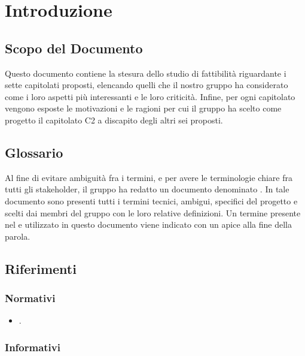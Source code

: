 \section{Introduzione}
\subsection{Scopo del Documento}
Questo documento contiene la stesura dello studio di fattibilità riguardante i sette capitolati proposti, elencando quelli che il nostro gruppo ha considerato come i loro aspetti più interessanti e le loro criticità. Infine, per ogni capitolato vengono esposte le motivazioni e le ragioni per cui il gruppo ha scelto come progetto il capitolato C2 \NomeProgetto{} a discapito degli altri sei proposti.

\subsection{Glossario}
Al fine di evitare ambiguità fra i termini, e per avere le terminologie chiare fra tutti gli stakeholder, il gruppo \Gruppo{} ha redatto un documento denominato .
In tale documento sono presenti tutti i termini tecnici, ambigui, specifici del progetto e scelti dai membri del gruppo con le loro relative definizioni.
Un termine presente nel  e utilizzato in questo documento viene indicato con un apice  alla fine della parola.

\subsection{Riferimenti}

\subsubsection{Normativi}
\begin{itemize}
\item {}.
\end{itemize}

\subsubsection{Informativi}

